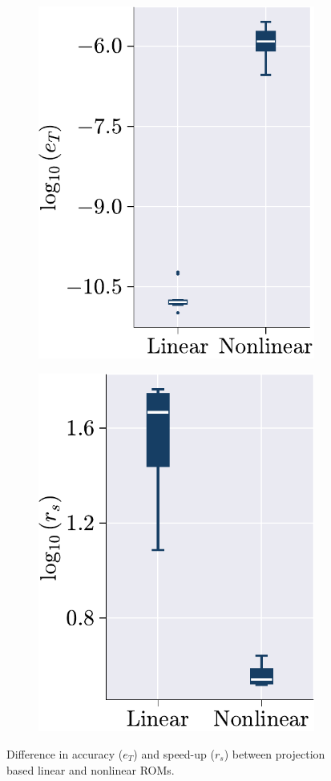 \documentclass[11pt]{article}
\begin{document}
        \begin{figure}[t]
            \centering
            \begin{subfigure}[b]{0.47\linewidth}
                \centering
                \includegraphics[height=0.95\linewidth]{error_comp.pdf}
                \caption{}
                \label{fig:HC_ERROR_SPDUP_c}
            \end{subfigure}\hfill
            \begin{subfigure}[b]{0.47\linewidth}
                \centering
                \includegraphics[height=0.95\linewidth]{speed_up_comp.pdf}
                \caption{}
                \label{fig:HC_ERROR_SPDUP_d}
            \end{subfigure}
            \caption{Difference in accuracy ($e_T$) and speed-up ($r_s$) between projection based linear and nonlinear ROMs.}
            \label{fig:HC_ERROR_SPDUP}
        \end{figure}
\end{document}

